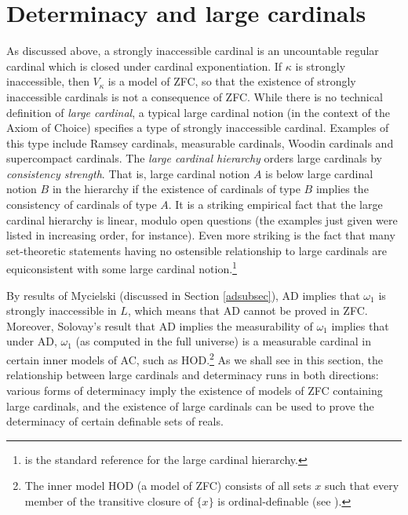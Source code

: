 \documentclass{book}%
\begin{document}
\section{Determinacy and large cardinals}

As discussed above, a strongly inaccessible cardinal is an uncountable regular cardinal which is closed under cardinal exponentiation.
If $\kappa$ is strongly inaccessible, then $V_{\kappa}$ is a model of ZFC, so that the existence of strongly inaccessible cardinals is not a consequence of ZFC. While there is no technical definition of \emph{large cardinal},
a typical large cardinal notion
(in the context of the Axiom of Choice) specifies a type of strongly inaccessible cardinal. Examples of this type include Ramsey cardinals, measurable cardinals, Woodin cardinals and supercompact cardinals. The \emph{large cardinal hierarchy}
orders large cardinals by \emph{consistency strength}.
That is, large cardinal notion $A$ is below large cardinal notion $B$ in the hierarchy if the existence of cardinals of type $B$ implies the consistency of cardinals of type $A$. It is a striking empirical fact that the large cardinal hierarchy is linear, modulo open questions (the examples just given were listed in increasing order, for instance). Even more striking is the fact that many set-theoretic statements having no ostensible relationship to large cardinals are equiconsistent with some large cardinal notion.\footnote{\cite{Kanamori} is the standard reference for the large cardinal hierarchy.}

By results of Mycielski (discussed in Section \ref{adsubsec}), AD implies that $\omega_{1}$ is strongly inaccessible in $L$, which means that AD cannot be proved in ZFC. Moreover,
Solovay's result that AD implies the measurability of $\omega_{1}$ implies that under AD, $\omega_{1}$ (as computed in the full universe) is a measurable cardinal in certain inner models of AC, such as HOD.\footnote{The inner model HOD (a model of ZFC) consists of all sets $x$ such that every member of the transitive closure of $\{x\}$ is ordinal-definable (see \cite[Chapter 13]{Jech:settheory}).} As we shall see in this section, the relationship between large cardinals and determinacy runs in both directions: various forms of determinacy imply the existence of models of ZFC containing large cardinals, and the existence of large cardinals can be used to prove the determinacy of certain definable sets of reals.
\end{document}
